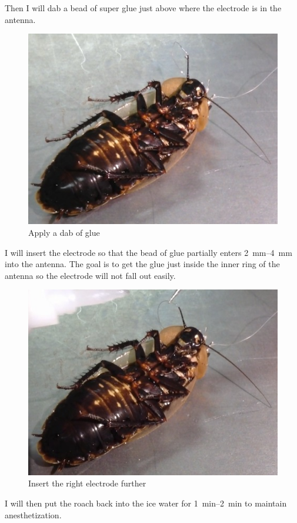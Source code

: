 Then I will dab a bead of super glue just above where the electrode is in the antenna. 
{\begin{figure}[ht!]
\centering
\includegraphics[scale=0.5]{Surgery Photos/relectrodeglue.jpg}
\caption{Apply a dab of glue}
\label{fig:relectrodeglue}
\end{figure}}
I will insert the electrode so that the bead of glue partially enters \SIrange{2}{4}{\milli\meter} into the antenna. The goal is to get the glue just inside the inner ring of the antenna so the electrode will not fall out easily. 
{\begin{figure}[ht!]
\centering
\includegraphics[scale=0.5]{Surgery Photos/relectrode2.jpg}
\caption{Insert the right electrode further}
\label{fig:relectrode2}
\end{figure}}
I will then put the roach back into the ice water for \SIrange{1}{2}{\minute} to maintain anesthetization.

